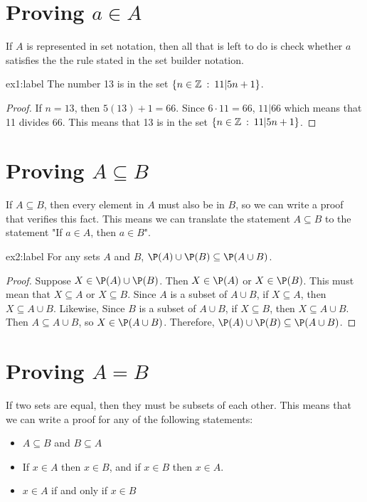 \section{Proving $a \in A$}

If $A$ is represented in set notation, then all that is left to do is check whether $a$ satisfies the the rule stated in the set builder notation. 


\begin{proposition}{ex1:label}
    The number 13 is in the set $\{n \in \mathbb{Z} \::\: 11 | 5n+1\}$.
\end{proposition}

\begin{proof}
    If $n=13$, then $5(13)+1 = 66$. Since $6\cdot 11 = 66$, $11|66$ which means that 11 divides 66. This means that 13 is in the set $\{n \in \mathbb{Z} \::\: 11 | 5n+1\}$.
\end{proof}


\section{Proving $A \subseteq B$}

If $A \subseteq B$, then every element in $A$ must also be in $B$, so we can write a proof that verifies this fact. This means we can translate the statement $A \subseteq B$ to the statement "If $a\in A$, then $a\in B$".


\begin{proposition}{ex2:label}
    For any sets $A$ and $B$, $\P(A) \cup \P(B) \subseteq \P(A \cup B)$.
\end{proposition}

\begin{proof}
    Suppose $X \in \P(A) \cup \P(B)$. Then $X \in \P(A)$ or $X \in \P(B)$. This must mean that $X \subseteq A$ or $X \subseteq B$. Since $A$ is a subset of $A \cup B$, if $X \subseteq A$, then $X \subseteq A \cup B$. Likewise, Since $B$ is a subset of $A \cup B$, if $X \subseteq B$, then $X \subseteq A \cup B$. Then $A \subseteq A \cup B$, so $X \in \P(A \cup B)$. Therefore, $\P(A) \cup \P(B) \subseteq \P(A \cup B)$.
\end{proof}



\section{Proving $A=B$}

If two sets are equal, then they must be subsets of each other. This means that we can write a proof for any of the following statements:

\begin{itemize}
    \item $A \subseteq B$ and $B \subseteq A$
    \item If $x \in A$ then $x \in B$, and if $x \in B$ then $x \in A$. 
    \item $ x\in A$ if and only if $x \in B$
\end{itemize}